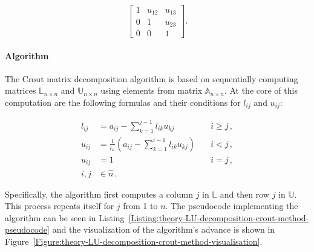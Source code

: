 \begin{equation}
	\begin{bmatrix}
		1      & u_{12} & u_{13} \\
		0      & 1      & u_{23} \\
		0      & 0      & 1
	\end{bmatrix}.
\end{equation}

\paragraph{Algorithm}
The Crout matrix decomposition algorithm is based on sequentially computing matrices $ \mathbb{L}_{n\times n} $ and $ \mathbb{U}_{n\times n} $ using elements from matrix $ \mathbb{A}_{n\times n} $. At the core of this computation are the following formulas and their conditions for $ l_{ij} $ and $ u_{ij} $:

\begin{align}
	l_{ij} &= a_{ij} - \sum_{k=1}^{j-1}l_{ik}u_{kj} 								  &\quad i \geq j\,, \label{Equation:theory-LU-decomposition-crout-method-lij} \\
	u_{ij} &= \frac{1}{l_{ii}} \left ( a_{ij} - \sum_{k=1}^{i-1}l_{ik}u_{kj} \right ) &\quad i < j\,, \\ \label{Equation:theory-LU-decomposition-crout-method-uij}
	u_{ij} &= 1 																	  &\quad i = j\,, \\
	i,j &\in \widehat{n} \nonumber\,.
\end{align}

Specifically, the algorithm first computes a column $ j $ in $ \mathbb{L} $ and then row $ j $ in $ \mathbb{U} $. This process repeats itself for $ j $ from 1 to $ n $. The pseudocode implementing the algorithm can be seen in Listing~\ref{Listing:theory-LU-decomposition-crout-method-pseudocode} and the visualization of the algorithm's advance is shown in Figure~\ref{Figure:theory-LU-decomposition-crout-method-visualisation}.

